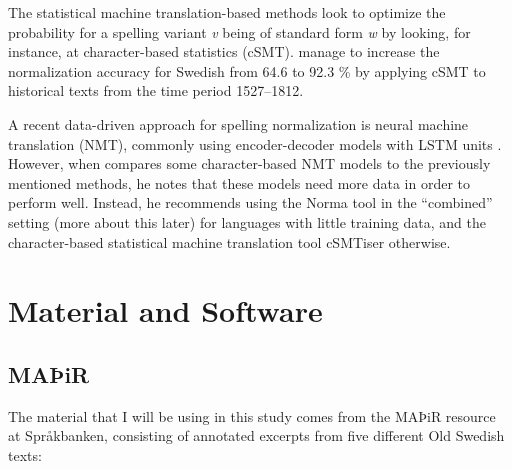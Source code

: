 \documentclass[11pt,a4paper]{article}
\begin{document}
The statistical machine translation-based methods look to optimize the probability for a spelling variant \emph{v} being of standard form \emph{w} by looking, for instance, at character-based statistics (cSMT). \citet{pettersson:13} manage to increase the normalization accuracy for Swedish from 64.6 to 92.3 \% by applying cSMT to historical texts from the time period 1527–1812.    

A recent data-driven approach for spelling normalization is neural machine translation (NMT), commonly using encoder-decoder models with LSTM units \citep{bollmann:19}. However, when \citet{bollmann:19} compares some character-based NMT models to the previously mentioned methods, he notes that these models need more data in order to perform well. Instead, he recommends using the Norma tool in the ``combined'' setting (more about this later) for languages with little training data, and the character-based statistical machine translation tool cSMTiser otherwise.     
\section{Material and Software}

\subsection{MAÞiR}
The material that I will be using in this study comes from the MAÞiR resource at Språkbanken, consisting of annotated excerpts from five different Old Swedish texts:
\end{document}
